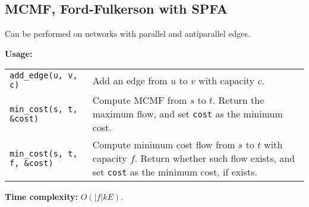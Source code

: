\subsection{MCMF, Ford-Fulkerson with SPFA}
\Tick Can be performed on networks with parallel and antiparallel edges.\par
\textbf{Usage:} \\[0.1cm]
\begin{tabular}{p{4.5cm} p{7cm}}
  \lstinline|add_edge(u, v, c)| & Add an edge from $u$ to $v$ with capacity $c$. \\
  \lstinline|min_cost(s, t, &cost)| & Compute MCMF from $s$ to $t$. Return the maximum flow, and set \lstinline|cost| as the minimum cost. \\
  \lstinline|min_cost(s, t, f, &cost)| & Compute minimum cost flow from $s$ to $t$ with capacity $f$. Return whether such flow exists, and set \lstinline|cost| as the minimum cost, if exists. \\
\end{tabular} \par
\textbf{Time complexity:} $O(|f|kE)$. \par



